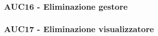 \documentclass[../analisi-dei-requisiti.tex]{subfiles}
\begin{document}


\subsubsection{AUC16 - Eliminazione gestore}%
\label{subs:AUC16}



\subsubsection{AUC17 - Eliminazione visualizzatore}%
\label{subs:AUC17}


\end{document}

